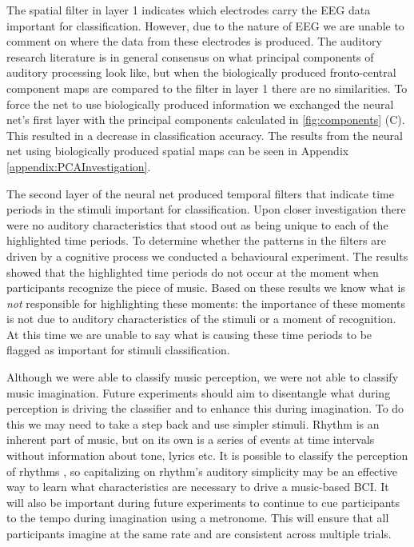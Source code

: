 The spatial filter in layer 1 indicates which electrodes carry the \ac{EEG} data important for classification. 
However, due to the nature of \ac{EEG} we are unable to comment on where the data from these electrodes is produced.
The auditory research literature is in general consensus on what principal components of auditory processing look like, but when the biologically produced fronto-central component maps are compared to the filter in layer 1 there are no similarities. 
To force the net to use biologically produced information we exchanged the neural net's first layer with the principal components calculated in \autoref{fig:components} (C). 
This resulted in a decrease in classification accuracy. The results from the neural net using biologically produced spatial maps can be seen in Appendix \ref{appendix:PCAInvestigation}.

The second layer of the neural net produced temporal filters that indicate time periods in the stimuli important for classification. 
Upon closer investigation there were no auditory characteristics that stood out as being unique to each of the highlighted time periods.
To determine whether the patterns in the filters are driven by a cognitive process we conducted a behavioural experiment.
The results showed that the highlighted time periods do not occur at the moment when participants recognize the piece of music. 
Based on these results we know what is \emph{not} responsible for highlighting these moments: the importance of these moments is not due to auditory characteristics of the stimuli or a moment of recognition.
At this time we are unable to say what is causing these time periods to be flagged as important for stimuli classification. 

Although we were able to classify music perception, we were not able to classify music imagination.
Future experiments should aim to disentangle what during perception is driving the classifier and to enhance this during imagination.
To do this we may need to take a step back and use simpler stimuli.
Rhythm is an inherent part of music, but on its own is a series of events at time intervals without information about tone, lyrics etc.
It is possible to classify the perception of rhythms \cite{stober2014audiomostly}, so capitalizing on rhythm's auditory simplicity may be an effective way to learn  what characteristics are necessary to drive a music-based \ac{BCI}.
It will also be important during future experiments to continue to cue participants to the tempo during imagination using a metronome.
This will ensure that all participants imagine at the same rate and are consistent across multiple trials.